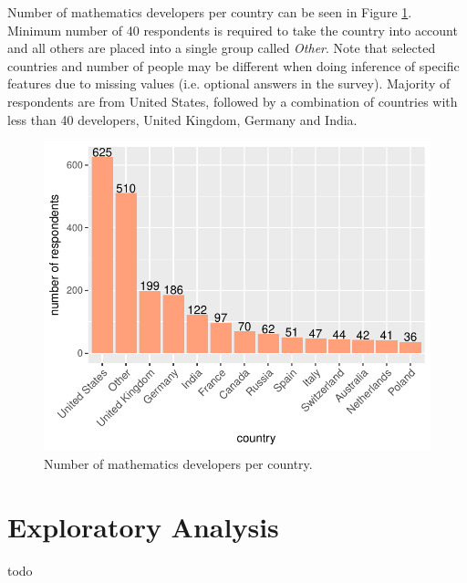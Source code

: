 \documentclass{article}
\begin{document}
\vspace{2mm}

Number of mathematics developers per country can be seen in Figure \ref{fig_0}. Minimum number of 40 respondents is required to take the country into account and all others are placed into a single group called \textit{Other}. Note that selected countries and number of people may be different when doing inference of specific features due to missing values (i.e. optional answers in the survey). Majority of respondents are from United States, followed by a combination of countries with less than 40 developers, United Kingdom, Germany and India.


\begin{figure}[H]
\centering
\includegraphics{report-005}
\caption{Number of mathematics developers per country.}\label{fig_0}
\end{figure}

\section{Exploratory Analysis}
todo
\end{document}

